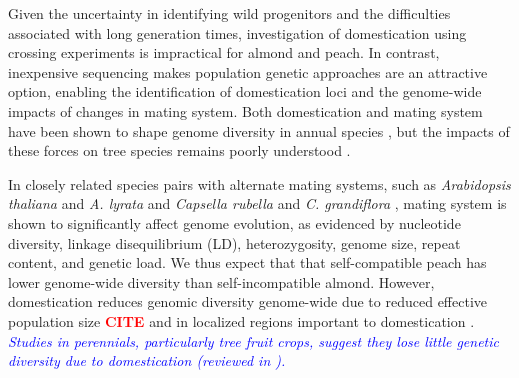 \documentclass[12pt]{article}
\newcommand{\citex}{\textcolor{red}{\bf CITE }}
\newcommand{\dv}[1]{\textcolor{blue}{\emph{#1}}}
\begin{document}
%
Given the uncertainty in identifying wild progenitors and the difficulties associated with long generation times, investigation of domestication using crossing experiments is impractical for almond and peach.
%
In contrast, inexpensive sequencing makes population genetic approaches \citep[cf.][]{ross2007plant} are an attractive option, enabling the identification of domestication loci and the genome-wide impacts of changes in mating system.   
%
Both domestication and mating system have been shown to shape genome diversity in annual species \citep{glemin2006impact, doebley2006molecular, slotte2013capsella}, but the impacts of these forces on tree species remains poorly understood \citep{mckey2010evolutionary, miller2011forest}.

In closely related species pairs with alternate mating systems, such as \emph{Arabidopsis thaliana} and \emph{A. lyrata} and \emph{Capsella rubella} and \emph{C. grandiflora} \citep{slotte2013capsella}, mating system is shown to significantly affect genome evolution, as evidenced by nucleotide diversity, linkage disequilibrium (LD), heterozygosity, genome size, repeat content, and genetic load.
%
We thus expect that that self-compatible peach has lower genome-wide diversity than self-incompatible almond.
%
However, domestication reduces genomic diversity genome-wide due to reduced effective population size \citex and in localized regions important to domestication \citep{glemin2006impact, doebley2006molecular}. 
\dv{Studies in perennials, particularly tree fruit crops, suggest they lose little genetic diversity due to domestication (reviewed in \citealp{miller2011forest}).}
%
% 
%
%
%
%
\end{document}

